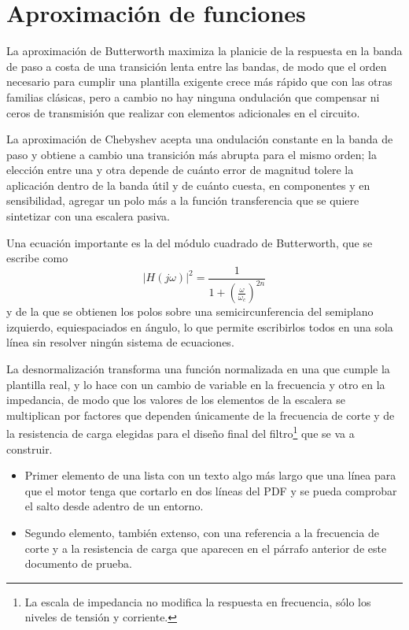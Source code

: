 \documentclass[11pt]{article}
\begin{document}
\section{Aproximación de funciones}

La aproximación de Butterworth maximiza la planicie de la respuesta en la banda de paso a costa de una transición lenta entre las bandas, de modo que el orden necesario para cumplir una plantilla exigente crece más rápido que con las otras familias clásicas, pero a cambio no hay ninguna ondulación que compensar ni ceros de transmisión que realizar con elementos adicionales en el circuito.

La aproximación de Chebyshev acepta una ondulación constante en la banda de paso y obtiene a cambio una transición más abrupta para el mismo orden; la elección entre una y otra depende de cuánto error de magnitud tolere la aplicación dentro de la banda útil y de cuánto cuesta, en componentes y en sensibilidad, agregar un polo más a la función transferencia que se quiere sintetizar con una escalera pasiva.

Una ecuación importante es la del módulo cuadrado de Butterworth, que se escribe como
\begin{equation}
  |H(j\omega)|^2 = \frac{1}{1+\left(\frac{\omega}{\omega_c}\right)^{2n}}
\end{equation}
y de la que se obtienen los polos sobre una semicircunferencia del semiplano izquierdo, equiespaciados en ángulo, lo que permite escribirlos todos en una sola línea sin resolver ningún sistema de ecuaciones.

La desnormalización transforma una función normalizada en una que cumple la plantilla real, y lo hace con un cambio de variable en la frecuencia y otro en la impedancia, de modo que los valores de los elementos de la escalera se multiplican por factores que dependen únicamente de la frecuencia de corte y de la resistencia de carga elegidas para el diseño final del filtro\footnote{La escala de impedancia no modifica la respuesta en frecuencia, sólo los niveles de tensión y corriente.} que se va a construir.

\begin{itemize}
  \item Primer elemento de una lista con un texto algo más largo que una línea para que el motor tenga que cortarlo en dos líneas del PDF y se pueda comprobar el salto desde adentro de un entorno.
  \item Segundo elemento, también extenso, con una referencia a la frecuencia de corte y a la resistencia de carga que aparecen en el párrafo anterior de este documento de prueba.
\end{itemize}
\end{document}
